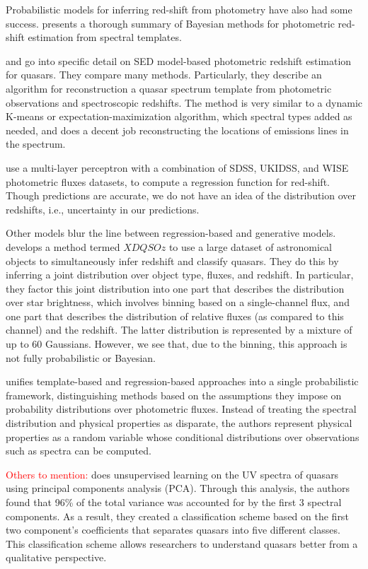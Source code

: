 \documentclass{article}
\newcommand{\red}[1]{\textcolor{red}{#1}}
\begin{document}
Probabilistic models for inferring red-shift from photometry have also had some success.  \cite{benitez2000bayesian} presents a thorough summary of Bayesian methods for photometric red-shift estimation from spectral templates.  

\cite{budavari2001photometric} and \cite{richards2001photometric} go into specific detail on SED
model-based photometric redshift estimation for quasars.  They compare many methods. Particularly, they describe an algorithm for reconstruction a quasar spectrum template from photometric observations and spectroscopic redshifts.  The method is very similar to a dynamic K-means or expectation-maximization
algorithm, which spectral types added as needed, and does a decent job reconstructing the locations
of emissions lines in the spectrum.

\cite{brescia2013photometric} use a multi-layer perceptron with a combination of SDSS, UKIDSS, and WISE photometric fluxes datasets, to compute a regression function for red-shift. Though predictions are accurate, we do not have an idea of the distribution over redshifts, i.e., uncertainty in our predictions.

Other models blur the line between regression-based and generative models.  \cite{bovy2012photometric} develops a method termed $XDQSOz$ to use a large dataset of astronomical objects to simultaneously infer redshift and classify quasars. They do this by inferring a joint distribution over object type, fluxes, and redshift. In particular, they factor this joint distribution
into one part that describes the distribution over star brightness, which involves binning based on a single-channel flux, and
one part that describes the distribution of relative fluxes (as compared to this channel) and the redshift. The latter distribution
is represented by a mixture of up to 60 Gaussians. However, we see that, due to the
binning, this approach is not fully probabilistic or Bayesian.


\cite{budavari2009unified} unifies template-based and regression-based
approaches into a single probabilistic framework, distinguishing methods based on the assumptions they impose on probability distributions over photometric fluxes. Instead of treating the spectral distribution and physical properties as disparate, the authors represent physical properties as a random variable whose conditional distributions over observations such as spectra can be computed.

\red{Others to mention: }
\cite{suzuki2006quasar} does unsupervised learning on the UV spectra of quasars using principal components analysis (PCA). Through this analysis, the authors found that 96\% of the total variance was accounted for by the first 3 spectral components. As a result, they created a classification scheme based on the first two component's coefficients that separates quasars into five different classes. This classification scheme allows researchers to understand quasars better from a qualitative perspective.
\end{document}
